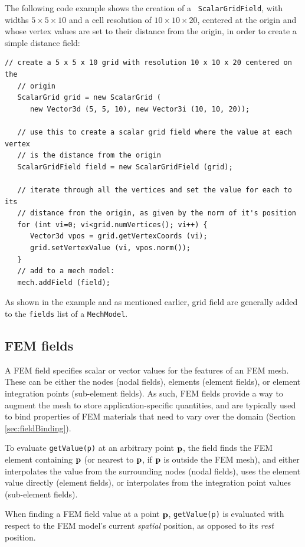 The following code example shows the creation of a {\tt
ScalarGridField}, with widths $5 \times 5 \times 10$ and a cell
resolution of $10 \times 10 \times 20$, centered at the origin and
whose vertex values are set to their distance from the origin,
in order to create a simple distance field:
%
\begin{lstlisting}[]
   // create a 5 x 5 x 10 grid with resolution 10 x 10 x 20 centered on the
   // origin
   ScalarGrid grid = new ScalarGrid (
      new Vector3d (5, 5, 10), new Vector3i (10, 10, 20));

   // use this to create a scalar grid field where the value at each vertex
   // is the distance from the origin
   ScalarGridField field = new ScalarGridField (grid);

   // iterate through all the vertices and set the value for each to its
   // distance from the origin, as given by the norm of it's position
   for (int vi=0; vi<grid.numVertices(); vi++) {
      Vector3d vpos = grid.getVertexCoords (vi);
      grid.setVertexValue (vi, vpos.norm()); 
   }
   // add to a mech model:
   mech.addField (field);
\end{lstlisting}
%
As shown in the example and as mentioned earlier, grid field are
generally added to the {\tt fields} list of a {\tt MechModel}.

\subsection{FEM fields}
\label{sec:femFields}

A FEM field specifies scalar or vector values for the features of an
FEM mesh. These can be either the nodes (nodal fields), elements
(element fields), or element integration points (sub-element fields).
As such, FEM fields provide a way to augment the mesh to store
application-specific quantities, and are typically used to bind
properties of FEM materials that need to vary over the domain (Section
\ref{sec:fieldBinding}).

To evaluate {\tt getValue(p)} at an arbitrary point ${\bf p}$, the field
finds the FEM element containing ${\bf p}$ (or nearest to ${\bf p}$, if ${\bf p}$ is
outside the FEM mesh), and either interpolates the value from the
surrounding nodes (nodal fields), uses the element value directly
(element fields), or interpolates from the integration point values
(sub-element fields).

\begin{sideblock}
When finding a FEM field value at a point ${\bf p}$, 
{\tt getValue(p)} is evaluated with respect to the FEM model's current
{\it spatial} position, as opposed to its {\it rest} position.
\end{sideblock}

